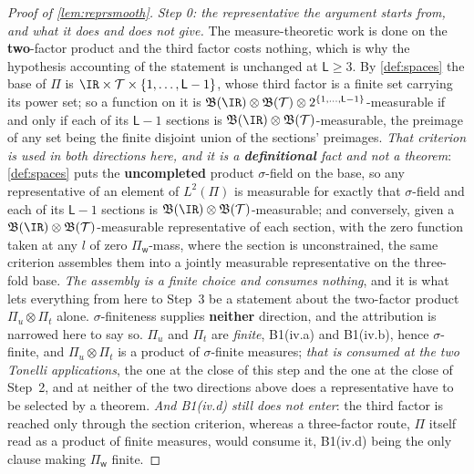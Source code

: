\begin{proof}[Proof of \cref{lem:reprsmooth}]
\emph{Step 0: the representative the argument starts from, and what it does and does not give.}
The measure-theoretic work is done on the \textbf{two}-factor product and the third factor costs
nothing, which is why the hypothesis accounting of the statement is unchanged at $\mathsf L\ge3$.
By \cref{def:spaces} the base of $\Pi$ is $\IR\times\mathcal T\times\{1,\dots,\mathsf L-1\}$, whose third
factor is a finite set carrying its power set; so a function on it is
$\mathfrak B(\IR)\otimes\mathfrak B(\mathcal T)\otimes2^{\{1,\dots,\mathsf L-1\}}$-measurable if and only
if each of its $\mathsf L-1$ sections is $\mathfrak B(\IR)\otimes\mathfrak B(\mathcal T)$-measurable, the
preimage of any set being the finite disjoint union of the sections' preimages. \emph{That criterion is
used in both directions here, and it is a \textbf{definitional} fact and not a theorem}: \cref{def:spaces}
puts the \textbf{uncompleted} product $\sigma$-field on the base, so any representative of an element of
$L^{2}(\Pi)$ is measurable for exactly that $\sigma$-field and each of its $\mathsf L-1$ sections is
$\mathfrak B(\IR)\otimes\mathfrak B(\mathcal T)$-measurable; and conversely, given a
$\mathfrak B(\IR)\otimes\mathfrak B(\mathcal T)$-measurable representative of each section, with the
zero function taken at any $l$ of zero $\Pi_{\mathsf w}$-mass, where the section is
unconstrained, the same criterion assembles them into a jointly measurable representative on the
three-fold base.
\emph{The assembly is a finite choice and consumes nothing}, and it is what lets everything from here to
Step~3 be a statement about the two-factor product $\Pi_u\otimes\Pi_t$ alone.
$\sigma$-finiteness supplies \textbf{neither} direction, and the attribution is narrowed here to
say so. $\Pi_u$ and $\Pi_t$ are \emph{finite}, B1(iv.a) and B1(iv.b), hence $\sigma$-finite, and
$\Pi_u\otimes\Pi_t$ is a product of $\sigma$-finite measures; \emph{that is consumed at the two Tonelli
applications}, the one at the close of this step and the one at the close of Step~2, and at neither of
the two directions above does a representative have to be selected by a theorem. \emph{And B1(iv.d)
still does not enter}: the third factor is reached only through the section criterion, whereas a
three-factor route, $\Pi$ itself read as a product of finite measures, would consume it, B1(iv.d)
being the only clause making $\Pi_{\mathsf w}$ finite.

\end{proof}
